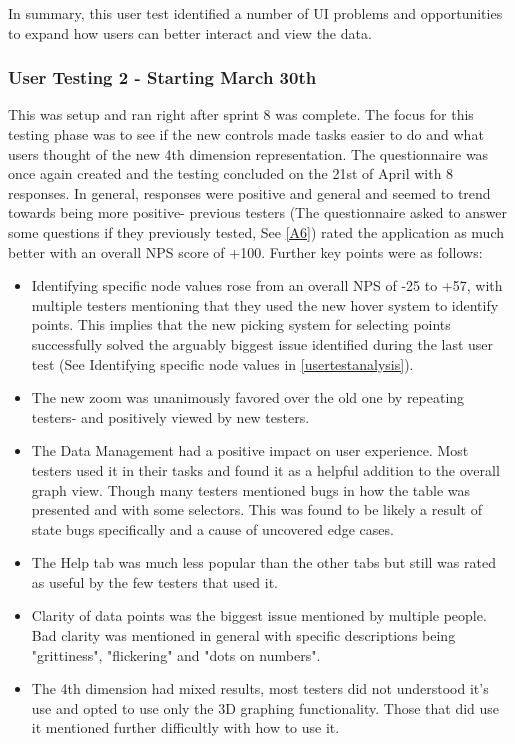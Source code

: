 In summary, this user test identified a number of UI problems and opportunities to expand how users can better interact and view the data.

\subsubsection{User Testing 2 - Starting March 30th}
This was setup and ran right after sprint 8 was complete. The focus for this testing phase was to see if the new controls made tasks easier to do and what users thought of the new 4th dimension representation. The questionnaire was once again created and the testing concluded on the 21st of April with 8 responses. In general, responses were positive and general and seemed to trend towards being more positive- previous testers (The questionnaire asked to answer some questions if they previously tested, See \ref{A6}) rated the application as much better with an overall NPS score of +100. Further key points were as follows:

\begin{itemize}
    \item Identifying specific node values rose from an overall NPS of -25 to +57, with multiple testers mentioning that they used the new hover system to identify points. This implies that the new picking system for selecting points successfully solved the arguably biggest issue identified during the last user test (See Identifying specific node values in \ref{usertestanalysis}).
    \item The new zoom was unanimously favored over the old one by repeating testers- and positively viewed by new testers.
    \item The Data Management had a positive impact on user experience. Most testers used it in their tasks and found it as a helpful addition to the overall graph view. Though many testers mentioned bugs in how the table was presented and with some selectors. This was found to be likely a result of state bugs specifically and a cause of uncovered edge cases.
    \item The Help tab was much less popular than the other tabs but still was rated as useful by the few testers that used it.
    \item Clarity of data points was the biggest issue mentioned by multiple people. Bad clarity was mentioned in general with specific descriptions being "grittiness", "flickering" and "dots on numbers".
    \item The 4th dimension had mixed results, most testers did not understood it's use and opted to use only the 3D graphing functionality. Those that did use it mentioned further difficultly with how to use it.
\end{itemize}


